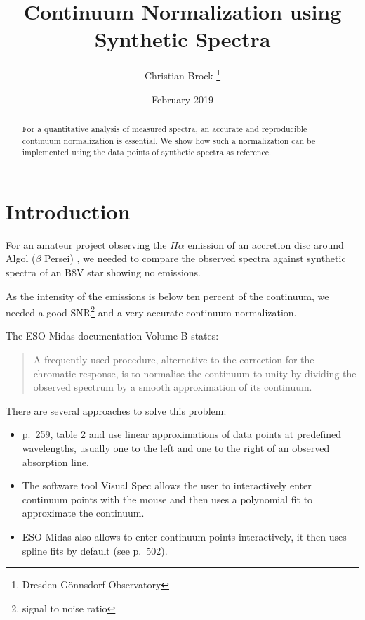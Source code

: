 \documentclass[10pt,a4paper,notitlepage,twocolumn]{article}
\title{Continuum Normalization using Synthetic Spectra}
\author{Christian Brock \footnote{Dresden Gönnsdorf Observatory}}
\date{February 2019}
\begin{document}
\setlength{\parindent}{0pt} 
\setlength{\parskip}{4pt} 

\maketitle

\begin{abstract}
	For a quantitative analysis of measured spectra, an accurate and reproducible continuum normalization is essential.
	We show how such a normalization can be implemented using the data points of synthetic spectra as reference.
\end{abstract}

\section{Introduction}

For an amateur project observing the $H\alpha$ emission of an accretion disc around Algol ($\beta$ Persei) \cite{Bitnar2017}, we needed to compare the observed spectra against synthetic spectra of an B8V star showing no emissions.

As the intensity of the emissions is below ten percent of the continuum, we needed a good SNR\footnote{signal to noise ratio} and a very accurate continuum normalization.

The ESO Midas documentation \cite{EsoMidas} Volume B states:
\begin{quote}
	A frequently used procedure, alternative to the correction for the chromatic response, is to normalise the continuum to unity by dividing the observed spectrum by a smooth approximation of its continuum.
\end{quote}

There are several approaches to solve this problem:
\begin{itemize} \itemsep -8pt
\item \cite{Richards1993} p.\ 259, table 2 and \cite{Liebisch2018} use linear approximations of data points at predefined wavelengths, usually one to the left and one to the right of an observed absorption line.
\item The software tool Visual Spec \cite{DesnouxVSpecTutorial} allows the user to interactively enter continuum points with the mouse and then uses a polynomial fit to approximate the continuum.
\item ESO Midas \cite{EsoMidas} also allows to enter continuum points interactively, it then uses spline fits by default (see \cite{SablowskiSchanne2018} p.\ 502).
\end{itemize}
\end{document}

